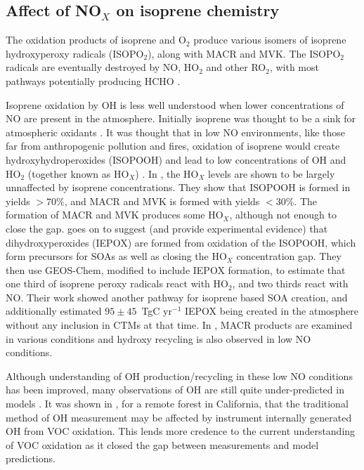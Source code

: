  \subsection{Affect of NO$_X$ on isoprene chemistry}

    The oxidation products of isoprene and O$_2$ produce various isomers of isoprene hydroxyperoxy radicals (ISOPO$_2$), along with MACR and MVK. 
    The ISOPO$_2$ radicals are eventually destroyed by NO, HO$_2$ and other RO$_2$, with most pathways potentially producing HCHO \citep{Wolf2016}.
    
    Isoprene oxidation by OH is less well understood when lower concentrations of NO are present in the atmosphere.
    Initially isoprene was thought to be a sink for atmospheric oxidants \citep[eg.]{Guenther2000}.
    It was thought that in low NO environments, like those far from anthropogenic pollution and fires, oxidation of isoprene would create hydroxyhydroperoxides (ISOPOOH) and lead to low concentrations of OH and HO$_2$ (together known as HO$_X$) \citet{Paulot2009b}.
    In \citet{Paulot2009b}, the HO$_X$ levels are shown to be largely unnaffected by isoprene concentrations.
    They show that ISOPOOH is formed in yields $> 70\%$, and MACR and MVK is formed with yields $< 30\%$.
    The formation of MACR and MVK produces some HO$_X$, although not enough to close the gap.
    \citet{Paulot2009b} goes on to suggest (and provide experimental evidence) that dihydroxyperoxides (IEPOX) are formed from oxidation of the ISOPOOH, which form precursors for SOAs as well as closing the HO$_X$ concentration gap.
    They then use GEOS-Chem, modified to include IEPOX formation, to estimate that one third of isoprene peroxy radicals react with HO$_2$, and two thirds react with NO. 
    Their work showed another pathway for isoprene based SOA creation, and additionally estimated $95 \pm 45$~TgC yr$^{-1}$ IEPOX being created in the atmosphere without any inclusion in CTMs at that time.
    In \cite{Crounse2012}, MACR products are examined in various conditions and hydroxy recycling is also observed in low NO conditions. 
    
    Although understanding of OH production/recycling in these low NO conditions has been improved, many observations of OH are still quite under-predicted in models \citep{Mao2012}.
    It was shown in \citet{Mao2012}, for a remote forest in California, that the traditional method of OH measurement may be affected by instrument internally generated OH from VOC oxidation.
    This lends more credence to the current understanding of VOC oxidation as it closed the gap between measurements and model predictions.
